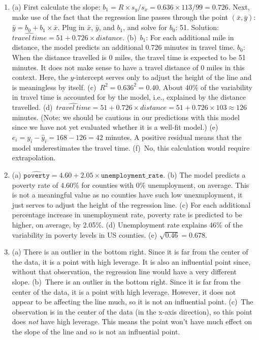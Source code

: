 \documentclass[
  10pt,
  openany]{book}
\begin{document}
\begin{enumerate}
  \addtocounter{enumi}{1}
\item
  (a) First calculate the slope: \(b_1 = R\times s_y/s_x = 0.636 \times 113 / 99 = 0.726\). Next, make use of the fact that the regression line passes through the point \((\bar{x},\bar{y})\): \(\bar{y} = b_0 + b_1 \times \bar{x}\). Plug in \(\bar{x}\), \(\bar{y}\), and \(b_1\), and solve for \(b_0\): 51. Solution: \(\widehat{travel~time} = 51 + 0.726 \times distance\). (b)~\(b_1\): For each additional mile in distance, the model predicts an additional 0.726 minutes in travel time. \(b_0\): When the distance travelled is 0 miles, the travel time is expected to be 51 minutes. It does not make sense to have a travel distance of 0 miles in this context. Here, the \(y\)-intercept serves only to adjust the height of the line and is meaningless by itself. (c)~\(R^2 = 0.636^2 = 0.40\). About 40\% of the variability in travel time is accounted for by the model, i.e., explained by the distance travelled. (d)~\(\widehat{travel~time} = 51 + 0.726 \times distance = 51 + 0.726 \times 103 \approx 126\) minutes. (Note: we should be cautious in our predictions with this model since we have not yet evaluated whether it is a well-fit model.) (e)~\(e_i = y_i - \hat{y}_i = 168 - 126 = 42\) minutes. A positive residual means that the model underestimates the travel time. (f)~No, this calculation would require extrapolation.

  \addtocounter{enumi}{1}
\item
  (a) \(\widehat{\texttt{poverty}} = 4.60 + 2.05 \times \texttt{unemployment_rate}.\) (b) The model predicts a poverty rate of 4.60\% for counties with 0\% unemployment, on average. This is not a meaningful value as no counties have such low unexmployment, it just serves to adjust the height of the regression line. (c) For each additional percentage increase in unemployment rate, poverty rate is predicted to be higher, on average, by 2.05\%. (d) Unemployment rate explains 46\% of the variability in poverty levels in US counties. (e) \(\sqrt{0.46} = 0.678.\)

  \addtocounter{enumi}{1}
\item
  (a) There is an outlier in the bottom right. Since it is far from the center of the data, it is a point with high leverage. It is also an influential point since, without that observation, the regression line would have a very different slope. (b)~There is an outlier in the bottom right. Since it is far from the center of the data, it is a point with high leverage. However, it does not appear to be affecting the line much, so it is not an influential point. (c)~The observation is in the center of the data (in the x-axis direction), so this point does \emph{not} have high leverage. This means the point won't have much effect on the slope of the line and so is not an influential point.


\end{enumerate}
\end{document}

